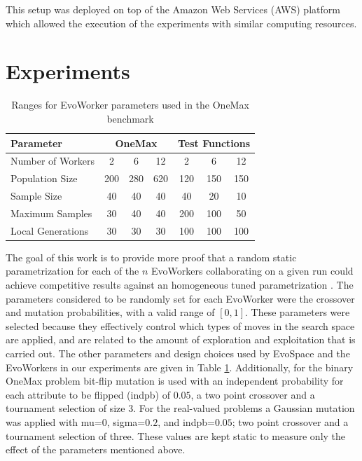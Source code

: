 \documentclass[conference]{IEEEtran}
\begin{document}
This setup was deployed on top of the Amazon Web Services (AWS)
platform which allowed the execution of the experiments with similar computing resources.

\section{Experiments}
 \label{sec:experiments}

\begin{table}[!t]
\caption{Ranges for EvoWorker parameters used in the OneMax benchmark}
\label{tab:params}
\centering
\begin{tabular}{l|cccccc }
\hline
\textbf{Parameter} & \multicolumn{3}{c}{OneMax} & \multicolumn{3}{c}{Test Functions} \\
\hline
Number of Workers & 2 & 6 & 12 & 2 & 6 & 12\\
\hline
\hline
Population Size & 200 & 280 & 620 & 120 & 150 & 150\\

Sample Size & 40 & 40 & 40 & 40 & 20 & 10\\

Maximum Samples & 30 & 40 & 40 & 200 & 100 & 50\\

Local Generations & 30 & 30 & 30 & 100 & 100 & 100\\

\end{tabular}
\end{table}
%
The goal of this work is to provide more proof that a random static parametrization for each of the $n$ EvoWorkers
collaborating on a given run could achieve competitive results against an homogeneous tuned parametrization
\cite{fuku1,fuku2,LNCS86720702}. The parameters considered to be randomly set for each EvoWorker
were the crossover and mutation probabilities, with a valid range of $[0,1]$. These parameters were
selected because they effectively control which types of moves in the search space are
applied, and are related to the amount of exploration and exploitation
that is carried out.
The other parameters and design choices used by EvoSpace and the EvoWorkers in our experiments are given in
Table \ref{tab:params}. Additionally, for the binary OneMax problem bit-flip mutation
is used with an independent probability for each attribute to be flipped (indpb) of $0.05$,
a two point crossover and a tournament selection of size 3. For the real-valued problems a Gaussian
mutation was applied with mu=$0$, sigma=$0.2$, and indpb=$0.05$; two point crossover and
a tournament selection of three. These values are kept static to measure only the effect of the
parameters mentioned above.
\end{document}
